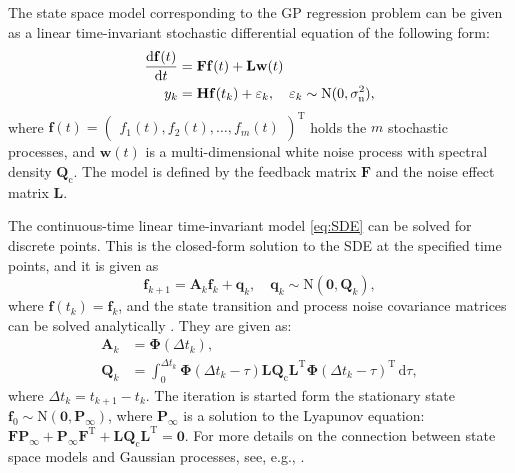 \documentclass[twoside,11pt]{article}
\begin{document}
The state space model corresponding to the GP regression problem can be given as
a linear time-invariant stochastic differential equation of the following form:
%
\begin{align} \label{eq:SDE}
  \begin{split}
  {\mathrm{d} \mathbf{f}(t) \over \mathrm{d} t} 
    &= \mathbf{F} \mathbf{f}(t) + \mathbf{L} \mathbf{w}(t) \\
  y_k 
    &= \mathbf{H} \mathbf{f}(t_k) + \varepsilon_k, 
    \quad \varepsilon_k \sim \mathrm{N}(0,\sigma_\mathrm{n}^2),
  \end{split}
\end{align}
%
where $\mathbf{f}(t) = \begin{pmatrix} f_1(t), f_2(t), \ldots, f_m(t)
\end{pmatrix}^\mathrm{T}$ holds the $m$ stochastic processes, and
$\mathbf{w}(t)$ is a multi-dimensional white noise process with spectral density
$\mathbf{Q}_\mathrm{c}$. The model is defined by the feedback matrix
$\mathbf{F}$ and the noise effect matrix $\mathbf{L}$.

The continuous-time linear time-invariant model \eqref{eq:SDE} can be solved for
discrete points. This is the closed-form solution to the SDE at the specified
time points, and it is given as
%
\begin{equation} \label{eq:state-space}
  \mathbf{f}_{k+1} = \mathbf{A}_k \mathbf{f}_k + \mathbf{q}_k, 
  \quad \mathbf{q}_k \sim \mathrm{N}(\mathbf{0}, \mathbf{Q}_k),
\end{equation}
%
where $\mathbf{f}(t_k) = \mathbf{f}_k$, and the state transition and process
noise covariance matrices can be solved analytically \citep[see,
e.g.,][]{Sarkka+Solin+Hartikainen:2013}. They are given as:
%
\begin{align}
  \mathbf{A}_k &= \mathbf{\Phi}(\Delta t_k), \\
  \mathbf{Q}_k &= \int_{0}^{\Delta t_k} 
    \mathbf{\Phi}(\Delta t_k-\tau)
    \mathbf{L} \mathbf{Q}_\mathrm{c} \mathbf{L}^\mathrm{T} 
    \mathbf{\Phi}(\Delta t_k-\tau)^\mathrm{T} \, \mathrm{d} \tau,
\end{align}
%
where $\Delta t_k = t_{k+1}-t_k$. The iteration is started form the stationary
state $\mathbf{f}_0 \sim \mathrm{N}(\mathbf{0},\mathbf{P}_\infty)$, where
$\mathbf{P}_\infty$ is a solution to the Lyapunov equation: $\mathbf{F}
\mathbf{P}_\infty + \mathbf{P}_\infty \mathbf{F}^\mathrm{T} + \mathbf{L}
\mathbf{Q}_\mathrm{c} \mathbf{L}^\mathrm{T} = \mathbf{0}$. For more details on
the connection between state space models and Gaussian processes, see, e.g.,
\citet{Sarkka+Solin+Hartikainen:2013}.
\end{document}
